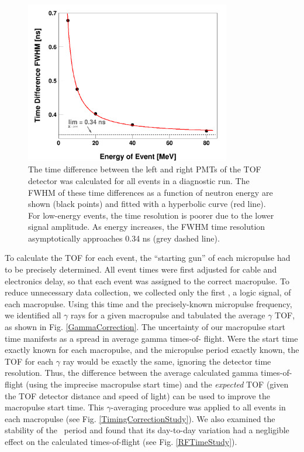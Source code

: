 \begin{figure}[tb]
    \centering
    \includegraphics[width=0.8\textwidth]{figures/DifferenceThresholdsFit.png}
    \caption[Intrinsic time resolution of time-of-flight detector as a function
    of signal amplitude]
    {
        The time difference between the left and right PMTs
        of the TOF detector was calculated for all events in a diagnostic run.
        The FWHM of these time differences as a function of
        neutron energy are shown (black points) and fitted with a hyperbolic
        curve (red line). For low-energy
        events, the time resolution is poorer due to the lower signal amplitude.
        As energy increases, the FWHM time resolution asymptotically approaches 0.34
        ns (grey dashed line).
    }
    \label{DifferenceThresholdsFit}
\end{figure}

To calculate the TOF for each event, the ``starting gun'' of each
micropulse had to be precisely determined. All event times were first adjusted for cable and 
electronics delay, so that each event was assigned to the correct macropulse.
To reduce unnecessary data collection, we collected only the first \tZero, a
logic signal, of each macropulse. 
Using this time and the precisely-known micropulse frequency, we identified all $\gamma$ rays 
for a given macropulse and tabulated
the average $\gamma$ TOF, as shown in Fig. \ref{GammaCorrection}.
The uncertainty of our macropulse start time manifests as a spread in average gamma times-of-
flight. Were the start time exactly known for each macropulse, and the
micropulse period exactly known, the TOF for each $\gamma$ ray would be
exactly the same, ignoring the detector time resolution. Thus, the difference between the 
average calculated gamma times-of-flight (using the imprecise macropulse start
time) and the \textit{expected} TOF (given the TOF detector distance and speed of light)
can be used to improve the macropulse start time. This $\gamma$-averaging
procedure was applied to all events in each macropulse (see Fig.
\ref{TimingCorrectionStudy}). We also examined the stability of the \tZero\
period and found that its day-to-day variation had a negligible effect on the
calculated times-of-flight (see Fig. \ref{RFTimeStudy}).

